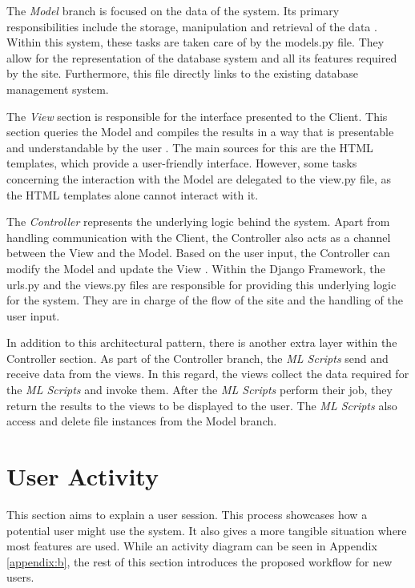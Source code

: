 \documentclass{l4proj}
\begin{document}
The \textit{Model} branch is focused on the data of the system. Its primary responsibilities include the storage, manipulation and retrieval of the data \citep{fowler2012patterns}. Within this system, these tasks are taken care of by the models.py file. They allow for the representation of the database system and all its features required by the site. Furthermore, this file directly links to the existing database management system. 

The \textit{View} section is responsible for the interface presented to the Client. This section queries the Model and compiles the results in a way that is presentable and understandable by the user \citep{fowler2012patterns}. The main sources for this are the HTML templates, which provide a user-friendly interface. However, some tasks concerning the interaction with the Model are delegated to the view.py file, as the HTML templates alone cannot interact with it.

The \textit{Controller} represents the underlying logic behind the system. Apart from handling communication with the Client, the Controller also acts as a channel between the View and the Model. Based on the user input, the Controller can modify the Model and update the View \citep{fowler2012patterns}. Within the Django Framework, the urls.py and the views.py files are responsible for providing this underlying logic for the system. They are in charge of the flow of the site and the handling of the user input. 

In addition to this architectural pattern, there is another extra layer within the Controller section. As part of the Controller branch, the \textit{ML Scripts} send and receive data from the views. In this regard, the views collect the data required for the \textit{ML Scripts} and invoke them. After the \textit{ML Scripts} perform their job, they return the results to the views to be displayed to the user. The \textit{ML Scripts} also access and delete file instances from the Model branch. 

\section{User Activity}
This section aims to explain a user session. This process showcases how a potential user might use the system. It also gives a more tangible situation where most features are used. While an activity diagram can be seen in Appendix \ref{appendix:b}, the rest of this section introduces the proposed workflow for new users.
\end{document}
